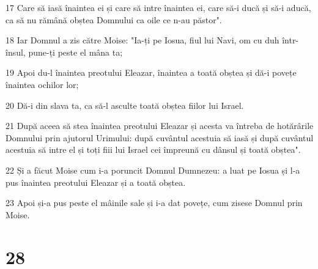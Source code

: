 \par 17 Care să iasă înaintea ei și care să intre înaintea ei, care să-i ducă și să-i aducă, ca să nu rămână obștea Domnului ca oile ce n-au păstor".
\par 18 Iar Domnul a zis către Moise: "Ia-ți pe Iosua, fiul lui Navi, om cu duh într-însul, pune-ți peste el mâna ta;
\par 19 Apoi du-l înaintea preotului Eleazar, înaintea a toată obștea și dă-i povețe înaintea ochilor lor;
\par 20 Dă-i din slava ta, ca să-l asculte toată obștea fiilor lui Israel.
\par 21 După aceea să stea înaintea preotului Eleazar și acesta va întreba de hotărârile Domnului prin ajutorul Urimului: după cuvântul acestuia să iasă și după cuvântul acestuia să intre el și toți fiii lui Israel cei împreună cu dânsul și toată obștea".
\par 22 Și a făcut Moise cum i-a poruncit Domnul Dumnezeu: a luat pe Iosua și l-a pus înaintea preotului Eleazar și a toată obștea.
\par 23 Apoi și-a pus peste el mâinile sale și i-a dat povețe, cum zisese Domnul prin Moise.

\chapter{28}

